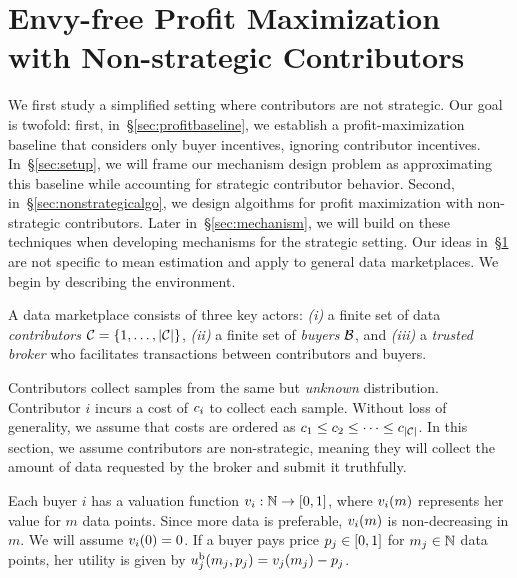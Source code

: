 \section{Envy-free Profit Maximization with Non-strategic Contributors}
\label{sec:buyerside}

We first study a simplified setting where contributors are not strategic. Our goal is twofold:  
first, in~\S\ref{sec:profitbaseline}, we establish a profit-maximization baseline that considers only buyer incentives, ignoring contributor incentives.
In~\S\ref{sec:setup}, we will frame our mechanism design problem as approximating this baseline while accounting for strategic contributor behavior.  
Second, in~\S\ref{sec:nonstrategicalgo}, we design algoithms for profit maximization with non-strategic contributors. Later in~\S\ref{sec:mechanism}, we will build on these techniques when developing mechanisms for the strategic setting.  
Our ideas in~\S\ref{sec:buyerside} are not specific to mean estimation
and apply to general data marketplaces.  
We begin by describing the environment.  



A data marketplace consists of three key actors:  
\emph{(i)} a finite set of data \emph{contributors} $\mathcal{C} = \{1,\dots,|\mathcal{C}|\}$,  
\emph{(ii)} a finite set of \emph{buyers} $\mathcal{B}$, and  
\emph{(iii)} a \emph{trusted broker} who facilitates transactions between contributors and buyers.  

Contributors collect samples from the same but \emph{unknown} distribution. Contributor $i$ incurs a cost of $c_i$ to collect each sample.  
Without loss of generality, we assume that costs are ordered as $c_1 \leq c_2 \leq \dots \leq c_{|\mathcal{C}|}$.  
In this section, we assume contributors are non-strategic, meaning they
will collect the  amount of data requested by the broker and submit it truthfully.  


Each buyer $i$ has a valuation function $v_{i}: \mathbb{N} \to [0,1]$, where $v_{i}(m)$ represents her value for $m$ data points.  
Since more data is preferable, $v_{i}(m)$ is non-decreasing in $m$.  
We will assume $v_{i}(0)=0$.
If a buyer pays price $p_j \in [0,1]$ for $m_j \in \mathbb{N}$ data points, her
utility is given by  
$u^{\rm b}_{j}(m_j, p_j) = v_{j}(m_j) - p_j$.

